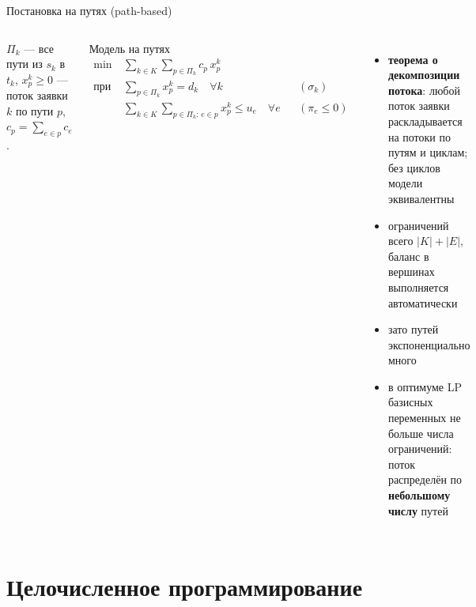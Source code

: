 \documentclass[aspectratio=169,10pt]{beamer}
\begin{document}
\begin{frame}{Постановка на путях (path-based)}
\begin{columns}[T]
$\Pi_k$ --- все пути из $s_k$ в $t_k$, $x^k_p\ge0$ --- поток заявки $k$ по пути $p$, $c_p=\sum_{e\in p}c_e$.
\begin{block}{Модель на путях}
\vspace{-6pt}
\begin{align*}
\min\ & \sum_{k\in K}\sum_{p\in\Pi_k} c_p\,x^k_p\\
\text{при}\ & \sum_{p\in\Pi_k} x^k_p = d_k \quad\forall k &&(\sigma_k)\\
& \sum_{k\in K}\sum_{p\in\Pi_k:\,e\in p} x^k_p \le u_e\quad\forall e &&(\pi_e\le 0)
\end{align*}
\end{block}
\begin{itemize}\setlength{\itemsep}{4pt}
\item \textbf{теорема о декомпозиции потока}: любой поток заявки раскладывается на потоки по путям и циклам; без циклов модели эквивалентны
\item ограничений всего $|K|+|E|$, баланс в вершинах выполняется автоматически
\item зато путей \alert{экспоненциально много}
\item в оптимуме LP базисных переменных не больше числа ограничений: поток распределён по \textbf{небольшому числу} путей
\end{itemize}
\end{columns}
\end{frame}

\section{Целочисленное программирование}
\end{document}
